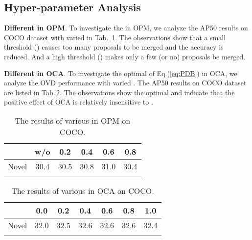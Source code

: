 \documentclass[10pt,twocolumn,letterpaper]{article}
\begin{document}
\subsection{Hyper-parameter Analysis}

\textbf{Different  in OPM}.
To investigate the  in OPM, we analyze the AP50 results on COCO dataset with varied  in Tab.~\ref{tab:ablation_on_IOU}. The observations show that a small threshold () causes too many proposals to be merged and the accuracy is reduced. And a high threshold () makes only a few (or no) proposals be merged.



\textbf{Different  in OCA}.
To investigate the optimal  of Eq.(\ref{eq:PDB}) in OCA, we analyze the OVD performance with varied . The AP50 results on COCO dataset~\cite{coco_zeroshot} are listed in Tab.\,\ref{tab:effect_of_gamma_in_CBA}.
The observations show the optimal  and indicate that the positive effect of OCA is relatively insensitive to .

\begin{table}[t]
    \centering
    \caption{The results of various  in OPM on COCO.}
    \footnotesize{
    \begin{tabular}{l|ccccc}
        \toprule
         & w/o & 0.2 & 0.4 & 0.6 & 0.8 \\
        \midrule
        Novel & 30.4 &30.5  &30.8  & 31.0 &30.4  \\
        \color{gray}{Base}  & \color{gray}{52.8} &\color{gray}{52.6}  &\color{gray}{52.6}  & \color{gray}{52.9} &\color{gray}{52.0}  \\
\bottomrule
    \end{tabular}
    }
    \label{tab:ablation_on_IOU}
    \vspace{-1em}
    
\end{table}
\begin{table}[t]
    \centering
    \caption{The results of various  in OCA on COCO.}
    \footnotesize{
    \begin{tabular}{l|cccccc}
        \toprule
         & 0.0 & 0.2 & 0.4 & 0.6 & 0.8 & 1.0 \\
        \midrule
        Novel & 32.0 & 32.5 & 32.6 & 32.6 & 32.6 & 32.4 \\
        \color{gray}{Base}  & \color{gray}{53.1} & \color{gray}{53.3} & \color{gray}{53.4} & \color{gray}{53.5} & \color{gray}{53.4} & \color{gray}{53.3} \\
        \bottomrule
    \end{tabular}
    }
    \label{tab:effect_of_gamma_in_CBA}
\end{table}
\end{document}
